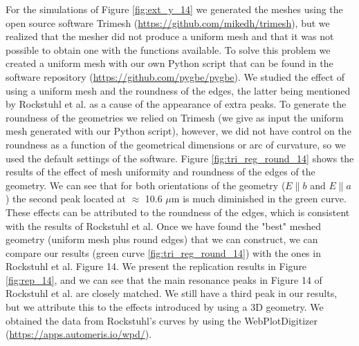 For the simulations of Figure \ref{fig:ext_y_14} we generated the meshes using the open source software Trimesh (\url{https://github.com/mikedh/trimesh}), 
but we realized that the mesher did not produce a uniform mesh and that it was not possible to obtain one with the functions available. To solve this problem 
we created a uniform mesh with our own Python script that can be found in the software repository (\url{https://github.com/pygbe/pygbe}). We studied the 
effect of using a uniform mesh and the roundness of the edges, the latter being mentioned by Rockstuhl et al. as a cause of the appearance of extra peaks. To 
generate the roundness of the geometries we relied on Trimesh (we give as input the uniform mesh generated with our Python script), however, we did not have 
control on the roundness as a function of the geometrical dimensions or arc of curvature, so we used the default settings of
the software. Figure \ref{fig:tri_reg_round_14} shows the results of the effect of mesh uniformity and roundness of the edges of the geometry. We can see 
that for both orientations of the geometry ($E\parallel b$ and $E\parallel a$) the second peak located at $\approx$ 10.6 $\mu$m is much diminished in the
green curve. These effects can be attributed to the roundness of the edges, which is consistent with the results of Rockstuhl et al. Once we have found the
"best" meshed geometry (uniform mesh plus round edges) that we can construct, we can compare our results (green curve \ref{fig:tri_reg_round_14}) with the ones
in Rockstuhl et al. Figure 14. We present the replication results in Figure \ref{fig:rep_14}, and we can see that the main resonance peaks in Figure 14 of 
Rockstuhl et al. are closely matched. We still have a third peak in our results, but we attribute this to the effects introduced by using a 3D geometry. We 
obtained the data from Rockstuhl's curves by using the WebPlotDigitizer (\url{https://apps.automeris.io/wpd/}).
 
